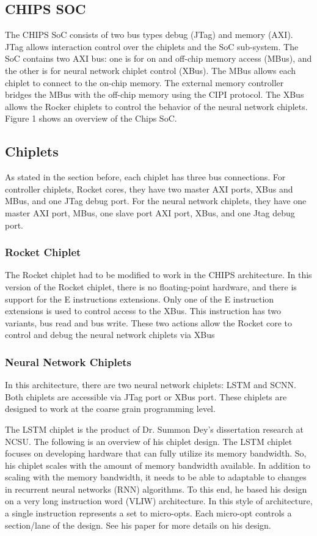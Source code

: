 \documentclass[../main.tex]{subfiles}
\begin{document}
\subsection{CHIPS SOC}
The CHIPS SoC consists of two bus types debug (JTag) and memory (AXI). JTag allows interaction control over the chiplets and the SoC sub-system. The SoC contains two AXI bus: one is for on and off-chip memory access (MBus), and the other is for neural network chiplet control (XBus).  The MBus allows each chiplet to connect to the on-chip memory. The external memory controller bridges the MBus with the off-chip memory using the CIPI protocol. The XBus allows the Rocker chiplets to control the behavior of the neural network chiplets. Figure 1 shows an overview of the Chips SoC. 

\subsection{Chiplets}
As stated in the section before, each chiplet has three bus connections. For controller chiplets, Rocket cores, they have two master AXI ports, XBus and MBus, and one JTag debug port. For the neural network chiplets, they have one master AXI port, MBus, one slave port AXI port, XBus, and one Jtag debug port.

\subsubsection{Rocket Chiplet}
The Rocket chiplet had to be modified to work in the CHIPS architecture. In this version of the Rocket chiplet, there is no floating-point hardware, and there is support for the E instructions extensions. Only one of the E instruction extensions is used to control access to the XBus. This instruction has two variants, bus read and bus write. These two actions allow the Rocket core to control and debug the neural network chiplets via XBus

\subsubsection{Neural Network Chiplets}
In this architecture, there are two neural network chiplets: LSTM and SCNN. Both chiplets are accessible via JTag port or XBus port. These chiplets are designed to work at the coarse grain programming level. 

The LSTM chiplet is the product of Dr. Summon Dey's dissertation research at NCSU. The following is an overview of his chiplet design\cite{Summon-Dey-LSTM}. The LSTM chiplet focuses on developing hardware that can fully utilize its memory bandwidth. So, his chiplet scales with the amount of memory bandwidth available. In addition to scaling with the memory bandwidth, it needs to be able to adaptable to changes in recurrent neural networks (RNN) algorithms. To this end, he based his design on a very long instruction word (VLIW) architecture. In this style of architecture, a single instruction represents a set to micro-opts. Each micro-opt controls a section/lane of the design. See his paper for more details on his design\cite{Summon-Dey-LSTM}.
\end{document}
